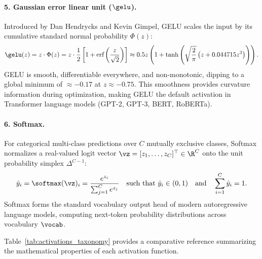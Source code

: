\documentclass[../../main.tex]{subfiles}
\begin{document}
\paragraph{5. Gaussian error linear unit ($\gelu$).}
Introduced by Dan Hendrycks and Kevin Gimpel, GELU scales the input by its cumulative standard normal probability $\Phi(z)$:
\begin{equation}
\label{eq:gelu_def}
\gelu(z) = z \cdot \Phi(z) = z \cdot \frac{1}{2} \left[ 1 + \text{erf}\left( \frac{z}{\sqrt{2}} \right) \right] \approx 0.5z \left( 1 + \tanh\left( \sqrt{\frac{2}{\pi}} \left( z + 0.044715 z^3 \right) \right) \right).
\end{equation}
GELU is smooth, differentiable everywhere, and non-monotonic, dipping to a global minimum of $\approx -0.17$ at $z \approx -0.75$. This smoothness provides curvature information during optimization, making GELU the default activation in Transformer language models (GPT-2, GPT-3, BERT, RoBERTa).

\paragraph{6. Softmax.}
For categorical multi-class predictions over $C$ mutually exclusive classes, Softmax normalizes a real-valued logit vector $\vz = [z_1, \dots, z_C]^\top \in \R^C$ onto the unit probability simplex $\Delta^{C-1}$:
\begin{equation}
\label{eq:softmax_def}
\hat{y}_i = \softmax(\vz)_i = \frac{e^{z_i}}{\sum_{j=1}^C e^{z_j}} \quad \text{such that } \hat{y}_i \in (0, 1) \quad \text{and} \quad \sum_{i=1}^C \hat{y}_i = 1.
\end{equation}
Softmax forms the standard vocabulary output head of modern autoregressive language models, computing next-token probability distributions across vocabulary $\vocab$.

Table~\ref{tab:activations_taxonomy} provides a comparative reference summarizing the mathematical properties of each activation function.
\end{document}
